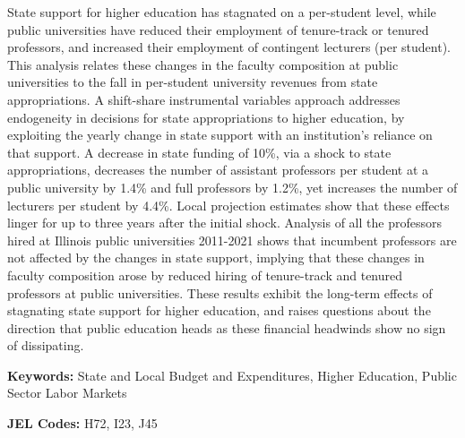 \noindent
State support for higher education has stagnated on a per-student level, while public universities have reduced their employment of tenure-track or tenured professors, and increased their employment of contingent lecturers (per student).
This analysis relates these changes in the faculty composition at public universities to the fall in per-student university revenues from state appropriations.
A shift-share instrumental variables approach addresses endogeneity in decisions for state appropriations to higher education, by exploiting the yearly change in state support with an institution's reliance on that support.
A decrease in state funding of 10\%, via a shock to state appropriations, decreases the number of assistant professors per student at a public university by 1.4\% and full professors by 1.2\%, yet increases the number of lecturers per student by 4.4\%.
Local projection estimates show that these effects linger for up to three years after the initial shock.
Analysis of all the professors hired at Illinois public universities 2011-2021 shows that incumbent professors are not affected by the changes in state support, implying that these changes in faculty composition arose by reduced hiring of tenure-track and tenured professors at public universities.
These results exhibit the long-term effects of stagnating state support for higher education, and raises questions about the direction that public education heads as these financial headwinds show no sign of dissipating.

\vspace{0.75cm}
\noindent\textbf{Keywords:}
State and Local Budget and Expenditures,
Higher Education,
Public Sector Labor Markets

\vspace{0.5cm}
\noindent\textbf{JEL Codes:} H72, I23, J45
